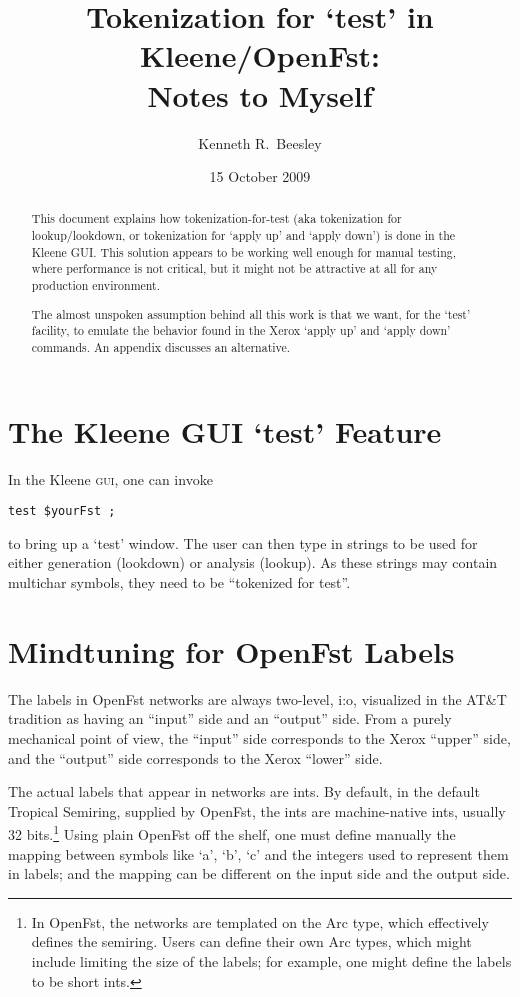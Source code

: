 \documentclass[letterpaper,12pt]{article}
\title{Tokenization for `test' in Kleene/OpenFst:\\
Notes to Myself}
\author{Kenneth R.~Beesley}
\date{15 October 2009}
\providecommand{\acro}{}\renewcommand{\acro}{\textsc}
\begin{document}
\maketitle

\begin{abstract}
This document explains how tokenization-for-test (aka tokenization
for lookup/lookdown, or tokenization for `apply up' and `apply
	down') is done in the Kleene GUI.  This solution appears to be
	working well enough
	for manual testing, where performance is not critical, but it might not be attractive at all for any production
		environment.

The almost unspoken assumption behind all this work is that we
want, for the `test' facility, to emulate the behavior found in the
Xerox `apply up' and `apply down' commands.  An appendix discusses
an alternative.
\end{abstract}

\section{The Kleene GUI `test' Feature}

In the Kleene \acro{gui}, one can invoke

\begin{Verbatim}[fontsize=\small]
test $yourFst ;
\end{Verbatim}

\noindent
to bring up a `test' window.  The user can then type in strings to
be used for either generation (lookdown) or analysis (lookup).  As
these strings may contain multichar symbols, they need to be
``tokenized for test''.

\section{Mindtuning for OpenFst Labels}

The labels in OpenFst networks are always two-level, i:o, visualized in
the AT\&T tradition as having an ``input'' side and an ``output'' side.
From a purely mechanical point of view, the ``input'' side corresponds to
the Xerox ``upper'' side, and the ``output'' side corresponds to the
Xerox ``lower'' side.

The
actual labels that appear in networks are ints.  By default, in the
default Tropical Semiring, supplied by OpenFst, the ints are
machine-native ints, usually 32 bits.\footnote{In
OpenFst, the networks are templated on the Arc type, which effectively
defines the semiring.  Users can define their own Arc types, which might
include limiting the size of the labels; for example, one might define the
labels to be short ints.}  Using plain OpenFst off the shelf, one must define
manually the mapping between symbols like `a', `b', `c' and the integers
used to represent them in labels; and the mapping can be different on the input side
and the output side.
\end{document}
